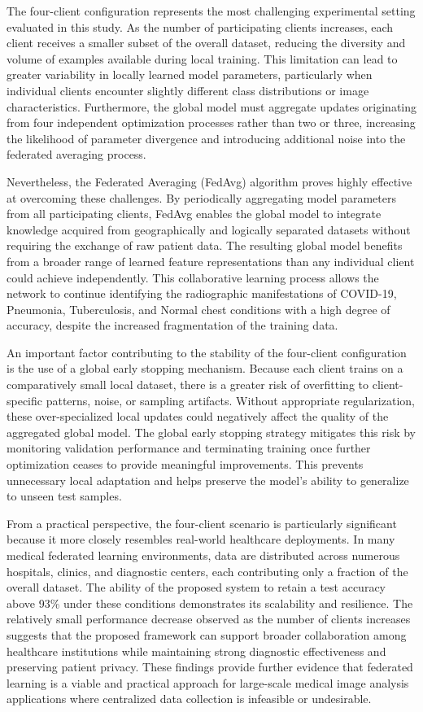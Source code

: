 The four-client configuration represents the most challenging experimental setting evaluated in this study. As the number of participating clients increases, each client receives a smaller subset of the overall dataset, reducing the diversity and volume of examples available during local training. This limitation can lead to greater variability in locally learned model parameters, particularly when individual clients encounter slightly different class distributions or image characteristics. Furthermore, the global model must aggregate updates originating from four independent optimization processes rather than two or three, increasing the likelihood of parameter divergence and introducing additional noise into the federated averaging process.

Nevertheless, the Federated Averaging (FedAvg) algorithm proves highly effective at overcoming these challenges. By periodically aggregating model parameters from all participating clients, FedAvg enables the global model to integrate knowledge acquired from geographically and logically separated datasets without requiring the exchange of raw patient data. The resulting global model benefits from a broader range of learned feature representations than any individual client could achieve independently. This collaborative learning process allows the network to continue identifying the radiographic manifestations of COVID-19, Pneumonia, Tuberculosis, and Normal chest conditions with a high degree of accuracy, despite the increased fragmentation of the training data.

An important factor contributing to the stability of the four-client configuration is the use of a global early stopping mechanism. Because each client trains on a comparatively small local dataset, there is a greater risk of overfitting to client-specific patterns, noise, or sampling artifacts. Without appropriate regularization, these over-specialized local updates could negatively affect the quality of the aggregated global model. The global early stopping strategy mitigates this risk by monitoring validation performance and terminating training once further optimization ceases to provide meaningful improvements. This prevents unnecessary local adaptation and helps preserve the model's ability to generalize to unseen test samples.

From a practical perspective, the four-client scenario is particularly significant because it more closely resembles real-world healthcare deployments. In many medical federated learning environments, data are distributed across numerous hospitals, clinics, and diagnostic centers, each contributing only a fraction of the overall dataset. The ability of the proposed system to retain a test accuracy above 93\% under these conditions demonstrates its scalability and resilience. The relatively small performance decrease observed as the number of clients increases suggests that the proposed framework can support broader collaboration among healthcare institutions while maintaining strong diagnostic effectiveness and preserving patient privacy. These findings provide further evidence that federated learning is a viable and practical approach for large-scale medical image analysis applications where centralized data collection is infeasible or undesirable.

